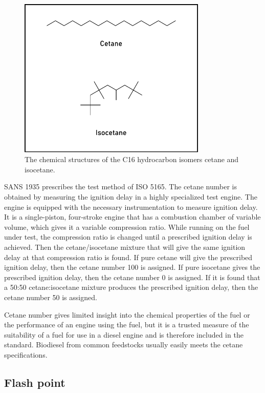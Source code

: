 \begin{figure}
\centering
\includegraphics[width=0.8\textwidth]{Figures/cetane.pdf}
\decoRule

\caption[Cetane and isocetane]{The chemical structures of the C16 hydrocarbon
isomers cetane and isocetane.}
\label{fig:Cetane}
\end{figure}

SANS 1935 prescribes the test method of ISO 5165. The cetane number is obtained
by measuring the ignition delay in a highly specialized test engine. The engine
is equipped with the necessary instrumentation to measure ignition delay. It is
a single-piston, four-stroke engine that has a combustion chamber of variable
volume, which gives it a variable compression ratio. While running on the fuel
under test, the compression ratio is changed until a prescribed ignition delay
is achieved. Then the cetane/isocetane mixture that will give the same ignition
delay at that compression ratio is found. If pure cetane will give the
prescribed ignition delay, then the cetane number 100 is assigned. If pure
isocetane gives the prescribed ignition delay, then the cetane number 0 is
assigned. If it is found that a 50:50 cetane:isocetane mixture produces the
prescribed ignition delay, then the cetane number 50 is assigned.

Cetane number gives limited insight into the chemical properties of the fuel or
the performance of an engine using the fuel, but it is a trusted measure of the
suitability of a fuel for use in a diesel engine and is therefore included in
the standard. Biodiesel from common feedstocks usually easily meets the cetane
specifications.

\subsection{Flash point}

